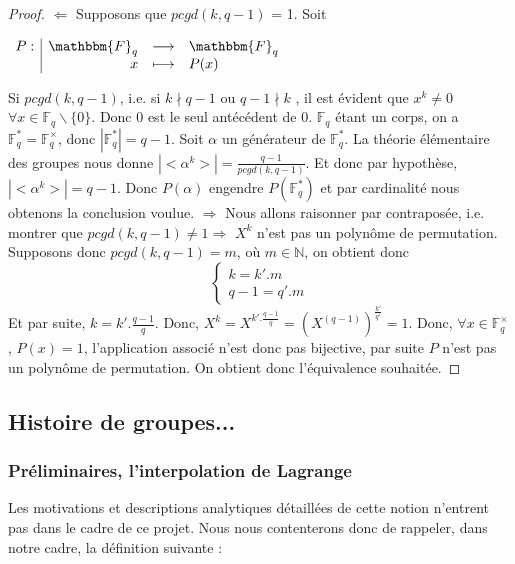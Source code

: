 \documentclass[12pt]{article}
\newcommand{\F}{\mathbbm{F}}
\newcommand{\Fq}{\mathds{F}_q}
\theoremstyle{definition}
\begin{document}
\begin{proof}

$\Leftarrow$ Supposons que $pcgd(k,q-1)$ = 1.
Soit
\begin{center}
$
\begin{array}{l|rcl}
\displaystyle
P : & \F _q & \longrightarrow & \F _q \\
    & x & \longmapsto & P(x)
\end{array}
$
\end{center}
Si $pcgd(k,q-1)$, i.e. si $k \nmid q-1$ ou $q-1 \nmid k$ , il est évident que  $x^k \neq 0$ $\forall x \in \Fq \backslash\{0\}$. Donc 0 est le seul antécédent de 0.
$\Fq$ étant un corps, on a $\Fq^* = \Fq^{\times}$, donc $|\Fq^*| = q-1$. Soit $\alpha$ un générateur de $\Fq^*$. La théorie élémentaire des groupes nous donne $|<\alpha^k>| = \frac{q-1}{pcgd(k,q-1)}$. Et donc par hypothèse, $|<\alpha^k>| =  q-1$.  Donc $P(\alpha)$ engendre $P(\Fq^*)$ et par cardinalité nous obtenons la conclusion voulue.\newline
$\Rightarrow$ Nous allons raisonner par contraposée, i.e. montrer que $pcgd(k,q-1) \ne 1 \Rightarrow$ $X^k$ n'est pas un polynôme de permutation.\newline
Supposons donc $pcgd(k,q-1) = m$, où $m \in \mathds{N}$, on obtient donc 
$$
\left\{
    \begin{array}{ll}
        k = k'.m \\
        q-1 = q'.m
    \end{array}
\right.
$$
Et par suite, $k  =k'.\frac{q-1}{q}$.\newline
Donc, $X^k = X^{k'.\frac{q-1}{q}} = (X^{(q-1)})^{\frac{k'}{q'}} = 1$. Donc, $\forall x \in \Fq^{\times}$, $P(x) = 1$, l'application associé n'est donc pas bijective, par suite $P$ n'est pas un polynôme de permutation. \newline
On obtient donc l'équivalence souhaitée.
\end{proof}

\subsection{Histoire de groupes...}
\subsubsection{Préliminaires, l'interpolation de Lagrange}

Les motivations et descriptions analytiques détaillées de cette notion n'entrent pas dans le cadre de ce projet. Nous nous contenterons donc de rappeler, dans notre cadre, la définition suivante :
\end{document}
